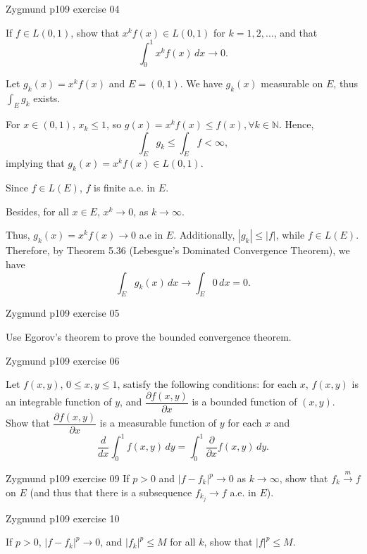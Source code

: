 \documentclass[UTF8,a4paper,10pt]{article}
\begin{document}
\pagebreak

\begin{Problem}[]{Zygmund p109 exercise 04}

  
  If $f \in L(0, 1)$, show that $x^kf(x) \in L(0, 1)$ for $k = 1, 2, \ldots$, and that
\[
\int_{0}^{1} x^kf(x) \,dx \rightarrow 0.
\]

\end{Problem}

Let \(g_k(x)=x^kf(x)\) and \(E = (0,1)\). We have
\(g_k(x)\) measurable on \(E\), thus \(\int_{E} g_k\) exists.

For \( x\in (0,1)\), \(x_k \leq 1\), so \(g(x) = x^kf(x)\leq f(x), \forall k\in \mathbb{N} \).
Hence, 
\[\int_{E}g_k \leq \int_{E}f<\infty,\]
implying that \(g_k(x) = x^kf(x) \in L(0, 1)\). 

\dotfill

Since \(f\in L(E)\), \(f\) is finite a.e. in \(E\).

Besides, for all \(x\in E\), \(x^k\to 0\), as \(k\to\infty\).

Thus, \(g_k(x) = x^k f(x) \to 0\) a.e in \(E\). 
Additionally, \(|g_k| \leq |f|\), while \(f \in L(E)\). Therefore, by Theorem 5.36 (Lebesgue's Dominated Convergence Theorem), we have
\[\int_{E} g_k(x) \, dx \to \int_{E} 0 \, dx = 0.\]

\begin{Problem}[]{Zygmund p109 exercise 05}

  
  Use Egorov's theorem to prove the bounded convergence theorem.

\end{Problem}

\begin{Problem}[]{Zygmund p109 exercise 06}



Let $f(x, y)$, $0 \leq x, y \leq 1$, satisfy the following conditions: for each $x$, $f(x, y)$ is an integrable function of $y$, and $\dfrac{\partial f(x, y)}{\partial x}$ is a bounded function of $(x, y)$. Show that $\dfrac{\partial f(x, y)}{\partial x}$ is a measurable function of $y$ for each $x$ and
\[
\frac{d}{dx} \int_{0}^{1} f(x, y) \,dy = \int_{0}^{1} \frac{\partial}{\partial x} f(x, y) \,dy.
\]

\end{Problem}


\begin{Problem}[]{Zygmund p109 exercise 09}
  If $p > 0$ and $|f - f_k|^p \rightarrow 0$ as $k \rightarrow \infty$, show that $f_k \overset{m}{\longrightarrow} f$ on $E$ (and thus that there is a subsequence $f_{k_j} \rightarrow f$ a.e. in $E$).


\end{Problem}

\begin{Problem}[]{Zygmund p109 exercise 10}

  If $p > 0$, $|f - f_k|^p \rightarrow 0$, and $|f_k|^p \leq M$ for all $k$, show that $|f|^p \leq M$.

\end{Problem}
\end{document}
